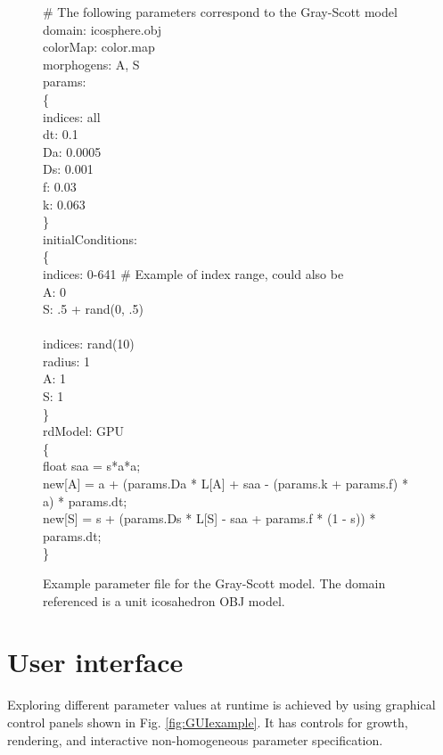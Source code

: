\begin{figure}[p]
\LinesNotNumbered
\begin{algorithm}[H]
	\# The following parameters correspond to the Gray-Scott model \\	
	domain: icosphere.obj \\
	colorMap: color.map \\
	morphogens: A, S\\
	
	params:\\
	\{\\
\quad indices: all\\
\quad dt: 0.1\\
\quad Da: 0.0005\\
\quad Ds: 0.001\\
\quad f: 0.03\\
\quad k: 0.063\\
	\}\\
	initialConditions:\\
	\{\\
\quad indices: 0-641 \# Example of index range, could also be \\
\quad A: 0\\
\quad S: .5 + rand(0, .5)\\
\quad \\
\quad indices: rand(10)\\
\quad radius: 1\\
\quad A: 1\\
\quad S: 1\\
	\}\\
	rdModel: GPU\\
	\{\\
\quad float saa = s*a*a;\\
\quad new[A] = a + (params.Da * L[A] + saa - (params.k + params.f) * a) * params.dt;\\
\quad new[S] = s + (params.Ds * L[S] - saa + params.f * (1 - s)) * params.dt;\\
	\}
\end{algorithm}
	\caption{Example parameter file for the Gray-Scott model. The domain referenced is a unit icosahedron OBJ model.}
	\label{fig:paramFileExample}
\end{figure}


\section{User interface}
Exploring different parameter values at runtime is achieved by using graphical control panels shown in Fig. \ref{fig:GUIexample}. It has controls for growth, rendering, and interactive non-homogeneous parameter specification. 

